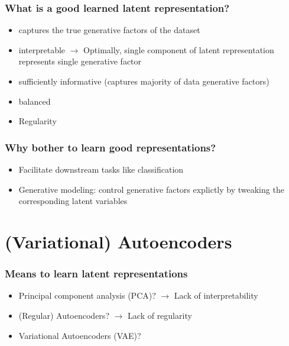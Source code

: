 \documentclass{beamer}
\theoremstyle{definition}
\begin{document}
    \begin{frame}
      \frametitle{What is a good learned latent representation?}
      \begin{itemize}
        \item captures the true generative factors of the dataset
        \item interpretable
              $\rightarrow$ Optimally, single component of latent representation represents single generative factor
        \item sufficiently informative (captures majority of data generative factors)
        \item balanced
        \item Regularity
      \end{itemize}
    \end{frame}

    \begin{frame}
        \frametitle{Why bother to learn good representations?}
        \begin{itemize}
          \item Facilitate downstream tasks like classification
          \item Generative modeling: control generative factors explictly by tweaking the corresponding latent variables
        \end{itemize}
      \end{frame}

    \section{(Variational) Autoencoders}
    \begin{frame}
      \frametitle{Means to learn latent representations}
      \begin{itemize}
        \item Principal component analysis (PCA)? $\rightarrow$ Lack of interpretability
        \item (Regular) Autoencoders? $\rightarrow$ Lack of regularity
        \item Variational Autoencoders (VAE)?
      \end{itemize}
    \end{frame}
\end{document}
